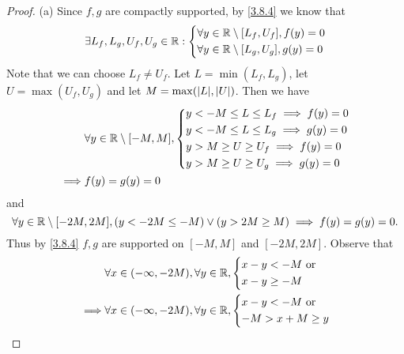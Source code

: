 \begin{proof}{(a)}
  Since \(f, g\) are compactly supported, by \cref{3.8.4} we know that
  \[
    \exists L_f, L_g, U_f, U_g \in \mathbb{R} : \begin{dcases}
      \forall y \in \mathbb{R} \setminus [L_f, U_f], f(y) = 0 \\
      \forall y \in \mathbb{R} \setminus [L_g, U_g], g(y) = 0
    \end{dcases}
  \]
  Note that we can choose \(L_f \neq U_f\).
  Let \(L = \min(L_f, L_g)\), let \(U = \max(U_f, U_g)\) and let \(M = \max(\abs{L}, \abs{U})\).
  Then we have
  \begin{align*}
             & \forall y \in \mathbb{R} \setminus [-M, M], \begin{dcases}
                                                     y < -M \leq L \leq L_f \implies f(y) = 0 \\
                                                     y < -M \leq L \leq L_g \implies g(y) = 0 \\
                                                     y > M \geq U \geq U_f \implies f(y) = 0  \\
                                                     y > M \geq U \geq U_g \implies g(y) = 0
                                                   \end{dcases} \\
    \implies & f(y) = g(y) = 0
  \end{align*}
  and
  \[
    \forall y \in \mathbb{R} \setminus [-2M, 2M], (y < -2M \leq -M) \lor (y > 2M \geq M) \implies f(y) = g(y) = 0.
  \]
  Thus by \cref{3.8.4} \(f, g\) are supported on \([-M, M]\) and \([-2M, 2M]\).
  Observe that
  \begin{align*}
             & \forall x \in (-\infty, -2M), \forall y \in \R, \begin{dcases}
                                                                 x - y < -M \text{ or } \\
                                                                 x - y \geq -M
                                                               \end{dcases}                      \\
    \implies & \forall x \in (-\infty, -2M), \forall y \in \R, \begin{dcases}
                                                                 x - y < -M \text{ or } \\
                                                                 -M > x + M \geq y

\end{dcases}
\end{align*}
\end{proof}
